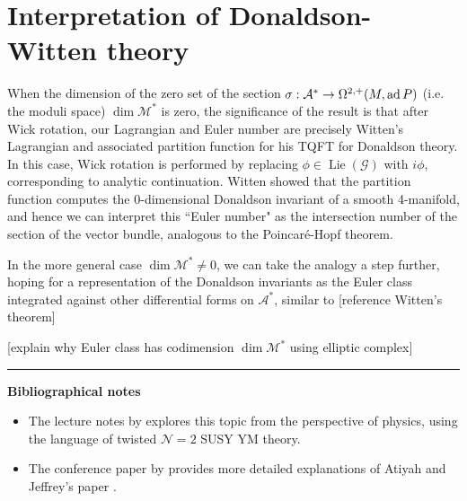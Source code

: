 \section{Interpretation of Donaldson-Witten theory}
When the dimension of the zero set 
of the section $\sigma : \mathcal{A}^* \to \Omega^{2,+}(M,\operatorname{ad} P)$ (i.e.
the moduli space) $\dim \mathcal{M}^*$ is zero, the significance of the result 
is that after Wick rotation, our Lagrangian and 
Euler number are precisely Witten's Lagrangian and associated partition function
for his TQFT for Donaldson theory.\cite{wittenTQFT} 
In this case, Wick rotation is performed by replacing 
$\phi \in \operatorname{Lie}(\mathcal{G})$ with $i\phi$, corresponding
to analytic continuation. Witten showed that the partition function computes the
0-dimensional Donaldson invariant of a smooth 4-manifold, and hence we can
interpret this ``Euler number" as the intersection number of the section of the 
vector bundle, analogous to the Poincar\'e-Hopf theorem. 

In the more general case $\dim \mathcal{M}^* \neq 0$, we can take the analogy a 
step further, hoping for a representation of the
Donaldson invariants as the Euler class integrated against
other differential forms on $\mathcal{A}^*$, similar to [reference Witten's theorem] 

[explain why Euler class has codimension $\dim\mathcal{M}^*$ using elliptic
complex]






\vspace{5mm}
\hrule 
\vspace{5mm}

\textbf{Bibliographical notes}
{\small
\begin{itemize}
	\item The lecture notes by \citet{cordes95} explores this topic from the
	perspective of physics, using the language of twisted 
	$\mathcal{N}=2$ SUSY YM theory.
	\item The conference paper by \citet{naber} provides more detailed
	explanations of Atiyah and Jeffrey's paper \cite{atiyahlagrangians}.
\end{itemize}
}


